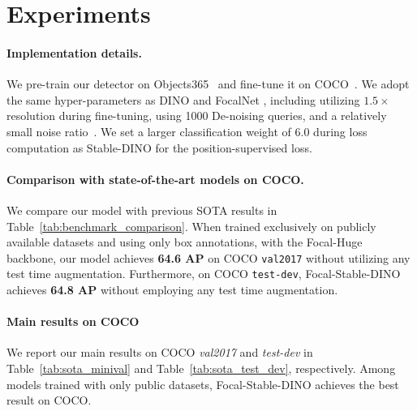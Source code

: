 \documentclass{article}
\begin{document}
 
%
 \section{Experiments}

  \paragraph{Implementation details.} We pre-train our detector on Objects365~\cite{shao2019objects365} and fine-tune it on COCO~\cite{lin2015microsoft}. We adopt the same hyper-parameters as DINO \cite{zhang2022dino} and FocalNet \cite{yang2022focal}, including utilizing $1.5 \times$ resolution during fine-tuning, using 1000 De-noising queries, and a relatively small noise ratio~\cite{li2022dn}. We set a larger classification weight of $6.0$ during loss computation as Stable-DINO \cite{liu2023detection} for the position-supervised loss.

  \paragraph{Comparison with state-of-the-art models on COCO.} We compare our model with previous SOTA results in Table~\ref{tab:benchmark_comparison}. When trained exclusively on publicly available datasets and using only box annotations, with the Focal-Huge backbone, our model achieves \textbf{64.6 AP} on COCO \texttt{val2017} without utilizing any test time augmentation. Furthermore, on COCO \texttt{test-dev}, Focal-Stable-DINO achieves \textbf{64.8 AP} without employing any test time augmentation.

  
  \paragraph{Main results on COCO} We report our main results on COCO \textit{val2017} and \textit{test-dev} in Table~\ref{tab:sota_minival} and Table~\ref{tab:sota_test_dev}, respectively. Among models trained with only public datasets, Focal-Stable-DINO achieves the best result on COCO. 

  \begin{table*}[ht]
\centering\setlength{\tabcolsep}{7pt}
\renewcommand{\arraystretch}{1.5}
\footnotesize
\vspace{-0mm}
\end{table*}
 
\end{document}
